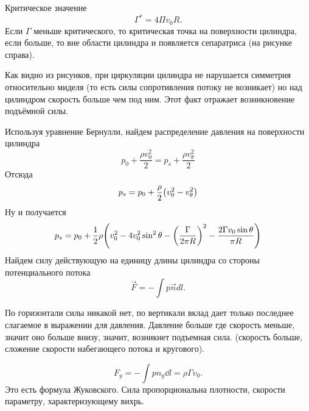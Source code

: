 Критическое значение
\begin{equation}
	\Gamma^*=4\Pi v_0 R.
\end{equation}
Если $\Gamma$ меньше критического, то критическая точка на поверхности цилиндра, если больше, то вне области цилиндра и появляется сепаратриса (на рисунке справа).

Как видно из рисунков, при циркуляции цилиндра не нарушается
симметрия относительно миделя (то есть силы сопротивления потоку не
возникает) но над цилиндром  скорость больше чем под ним. Этот факт отражает возникновение подъёмной силы.

Используя уравнение Бернулли, найдем распределение давления на
поверхности цилиндра
\begin{equation}
	p_0+\frac{\rho v_0^2}{2}=p_s+\frac{\rho v_\theta^2}{2}
\end{equation}
Отсюда
\begin{equation}
	p_s=p_0+\frac{\rho}{2}\qty(v_0^2-v_\theta^2)
\end{equation}
Ну и получается
\begin{equation}
	p_s=p_0+\frac12\rho\qty(v_0^2-4v_0^2\sin^2\theta-\qty(\frac{\Gamma}{2\pi R})^2-\frac{2\Gamma v_0\sin\theta}{\pi R})
\end{equation}
Найдем силу действующую на единицу длины цилиндра со стороны
потенциального потока
\begin{equation}
	\vec{F}=-\int p\vec{n}dl.
\end{equation}

По горизонтали силы никакой нет, по вертикали вклад дает только последнее слагаемое в выражении для давления. Давление больше где скорость меньше, значит оно больше внизу, значит, возникнет подъемная сила. (скорость больше, сложение скорости набегающего потока и кругового).

\begin{equation}
	F_y=-\int p n_y \dd{l}=\rho \Gamma v_0. 
\end{equation}
Это есть формула Жуковского. Сила пропорциональна плотности, скорости параметру, характеризующему вихрь.


